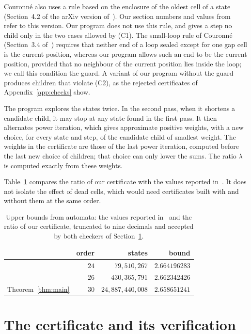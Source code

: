 \documentclass[11pt]{amsart}
\theoremstyle{definition}
\theoremstyle{remark}
\numberwithin{equation}{section}
\newcommand{\NStates}{24{,}887{,}440{,}008}
\begin{document}
Couronn\'e also uses a rule based on the enclosure of the oldest cell of a state (Section~4.2 of the arXiv version of~\cite{Cou25}). Our section numbers and values from~\cite{Cou25} refer to this version. Our program does not use this rule, and gives a step no child only in the two cases allowed by (C1). The small-loop rule of Couronn\'e (Section~3.4 of~\cite{Cou25}) requires that neither end of a loop sealed except for one gap cell is the current position, whereas our program allows such an end to be the current position, provided that no neighbour of the current position lies inside the loop; we call this condition the guard. A variant of our program without the guard produces children that violate (C2), as the rejected certificates of Appendix~\ref{app:checks} show.

The program explores the states twice. In the second pass, when it shortens a candidate child, it may stop at any state found in the first pass. It then alternates power iteration, which gives approximate positive weights, with a new choice, for every state and step, of the candidate child of smallest weight. The weights in the certificate are those of the last power iteration, computed before the last new choice of children; that choice can only lower the sums. The ratio $\lambda$ is computed exactly from these weights.

Table~\ref{tab:ratios} compares the ratio of our certificate with the values reported in~\cite{Cou25}. It does not isolate the effect of dead cells, which would need certificates built with and without them at the same order.

\begin{table}[ht]
\caption{Upper bounds from automata: the values reported in~\cite{Cou25} and the ratio of our certificate, truncated to nine decimals and accepted by both checkers of Section~\ref{sec:check}.}\label{tab:ratios}
\centering\small
\begin{tabular}{@{}lrrr@{}}
\toprule
 & order & states & bound\\
\midrule
\cite{Cou25} & $24$ & $79{,}510{,}267$ & $2.664196283$\\
\cite{Cou25} & $26$ & $430{,}365{,}791$ & $2.662342426$\\
Theorem~\ref{thm:main} & $30$ & $\NStates$ & $2.658651241$\\
\bottomrule
\end{tabular}
\end{table}

\section{The certificate and its verification}\label{sec:check}
\end{document}
